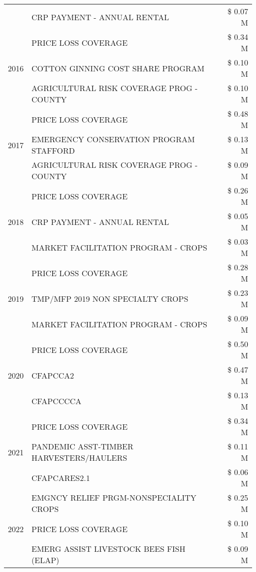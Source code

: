 \begin{tabular}{llr}
 & CRP PAYMENT - ANNUAL RENTAL & \$ 0.07 M \\
\cline{1-3}
\multirow[t]{3}{*}{2016} & PRICE LOSS COVERAGE & \$ 0.34 M \\
 & COTTON GINNING COST SHARE PROGRAM & \$ 0.10 M \\
 & AGRICULTURAL RISK COVERAGE PROG - COUNTY & \$ 0.10 M \\
\cline{1-3}
\multirow[t]{3}{*}{2017} & PRICE LOSS COVERAGE & \$ 0.48 M \\
 & EMERGENCY CONSERVATION PROGRAM STAFFORD & \$ 0.13 M \\
 & AGRICULTURAL RISK COVERAGE PROG - COUNTY & \$ 0.09 M \\
\cline{1-3}
\multirow[t]{3}{*}{2018} & PRICE LOSS COVERAGE & \$ 0.26 M \\
 & CRP PAYMENT - ANNUAL RENTAL & \$ 0.05 M \\
 & MARKET FACILITATION PROGRAM - CROPS & \$ 0.03 M \\
\cline{1-3}
\multirow[t]{3}{*}{2019} & PRICE LOSS COVERAGE & \$ 0.28 M \\
 & TMP/MFP 2019 NON SPECIALTY CROPS & \$ 0.23 M \\
 & MARKET FACILITATION PROGRAM - CROPS & \$ 0.09 M \\
\cline{1-3}
\multirow[t]{3}{*}{2020} & PRICE LOSS COVERAGE & \$ 0.50 M \\
 & CFAPCCA2 & \$ 0.47 M \\
 & CFAPCCCCA & \$ 0.13 M \\
\cline{1-3}
\multirow[t]{3}{*}{2021} & PRICE LOSS COVERAGE & \$ 0.34 M \\
 & PANDEMIC ASST-TIMBER HARVESTERS/HAULERS & \$ 0.11 M \\
 & CFAPCARES2.1 & \$ 0.06 M \\
\cline{1-3}
\multirow[t]{3}{*}{2022} & EMGNCY RELIEF PRGM-NONSPECIALITY CROPS & \$ 0.25 M \\
 & PRICE LOSS COVERAGE & \$ 0.10 M \\
 & EMERG ASSIST LIVESTOCK BEES FISH (ELAP) & \$ 0.09 M \\
\cline{1-3}
\bottomrule
\end{tabular}
